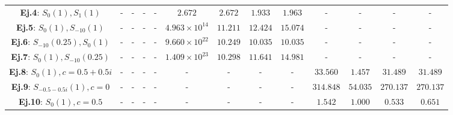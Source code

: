 \begin{table}
\begin{tabular}{|c|cccc|cccc|cccc|}
    \textbf{Ej.4}: $S_{0}(1), S_{1}(1)$      & -                                             & -                                                & -                                   & -        & $2.672$                & $2.672$        & $1.933$                 & $1.963$  & -                      & -              & -                       & -          \\
    \textbf{Ej.5}: $S_{0}(1), S_{-10}(1)$    & -                                             & -                                                & -                                   & -        & $4.963 \times 10^{14}$ & $11.211$       & $12.424$                & $15.074$ & -                      & -              & -                       & -          \\
    \textbf{Ej.6}: $S_{-10}(0.25), S_{0}(1)$ & -                                             & -                                                & -                                   & -        & $9.660 \times 10^{22}$ & $10.249$       & $10.035$                & $10.035$ & -                      & -              & -                       & -          \\
    \textbf{Ej.7}: $S_{0}(1), S_{-10}(0.25)$ & -                                             & -                                                & -                                   & -        & $1.409 \times 10^{23}$ & $10.298$       & $11.641$                & $14.981$ & -                      & -              & -                       & -          \\
    \textbf{Ej.8}: $S_{0}(1), c=0.5+0.5i$    & -                                             & -                                                & -                                   & -        & -                      & -              & -                       & -        & $33.560$               & $1.457$        & $31.489$                & $31.489$   \\
    \textbf{Ej.9}: $S_{-0.5-0.5i}(1), c=0$   & -                                             & -                                                & -                                   & -        & -                      & -              & -                       & -        & $314.848$              & $54.035$       & $270.137$               & $270.137$  \\
    \textbf{Ej.10}: $S_{0}(1), c=0.5$        & -                                             & -                                                & -                                   & -        & -                      & -              & -                       & -        & $1.542$                & $1.000$        & $0.533$                 & $0.651$    \\

\end{tabular}
\end{table}
